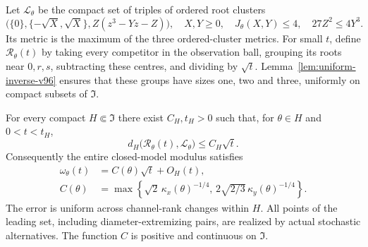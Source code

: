 Let $\mathcal L_\theta$ be the compact set of triples of ordered root
clusters
\begin{equation}\label{eq:leading-set-v96}
 \bigl(\{0\},\{-\sqrt X,\sqrt X\},Z(z^3-Yz-Z)\bigr),\quad
 X,Y\ge0,\quad J_\theta(X,Y)\le4,\quad27Z^2\le4Y^3.
\end{equation}
Its metric is the maximum of the three ordered-cluster metrics. For
small $t$, define $\mathcal R_\theta(t)$ by taking every competitor in
the observation ball, grouping its roots near $0,r,s$, subtracting
these centres, and dividing by $\sqrt t$. Lemma~\ref{lem:uniform-inverse-v96}
ensures that these groups have sizes one, two and three, uniformly on
compact subsets of $\mathfrak I$.

\begin{theorem}
\label{thm:uniform-normal-v96}
For every compact $H\Subset\mathfrak I$ there exist $C_H,t_H>0$ such
that, for $\theta\in H$ and $0<t<t_H$,
\begin{equation}\label{eq:uniform-Hausdorff-v96}
 d_H\bigl(\mathcal R_\theta(t),\mathcal L_\theta\bigr)
       \le C_H\sqrt t.
\end{equation}
Consequently the entire closed-model modulus satisfies
\begin{align}
 \omega_\theta(t)&=C(\theta)\sqrt t+O_H(t),\label{eq:uniform-law-v96}\\
 C(\theta)&=\max\left\{\sqrt2\,\kappa_x(\theta)^{-1/4},\,
              2\sqrt{2/3}\,\kappa_y(\theta)^{-1/4}\right\}.
                                                   \label{eq:C-v96}
\end{align}
The error is uniform across channel-rank changes within $H$.
All points of the leading set, including diameter-extremizing pairs,
are realized by actual stochastic alternatives. The function $C$ is
positive and continuous on $\mathfrak I$.
\end{theorem}
